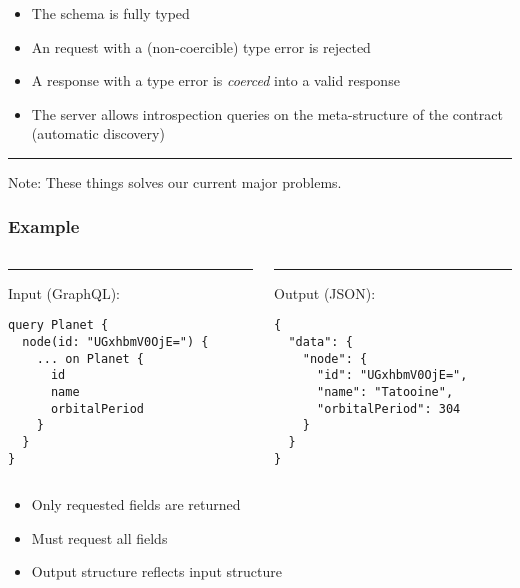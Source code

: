 \documentclass[lualatex]{beamer}
\begin{document}
\begin{frame}
  \begin{itemize}
  \item The schema is fully typed
  \item An request with a (non-coercible) type error is rejected
  \item A response with a type error is \emph{coerced} into a valid
    response
  \item The server allows introspection queries on the meta-structure
    of the contract (automatic discovery)
  \end{itemize}
  \rule{\textwidth}{1pt}
  Note: These things solves our current major problems.
\end{frame}

\begin{frame}[fragile]
  \frametitle{Example}
\begin{columns}[T] %
\begin{column}{.5\textwidth}
\color{black}\rule{\linewidth}{1pt}
Input (GraphQL):
\begin{verbatim}
query Planet {
  node(id: "UGxhbmV0OjE=") {
    ... on Planet {
      id
      name
      orbitalPeriod
    }
  }
}
\end{verbatim}
\end{column}
\hfill
\begin{column}{.5\textwidth}
\color{gray}\rule{\linewidth}{1pt}
Output (JSON):
\begin{verbatim}
{
  "data": {
    "node": {
      "id": "UGxhbmV0OjE=",
      "name": "Tatooine",
      "orbitalPeriod": 304
    }
  }
}
\end{verbatim}
\end{column}%
\end{columns}
\begin{itemize}
\item Only requested fields are returned
\item Must request all fields
\item Output structure reflects input structure
\end{itemize}
\end{frame}
\end{document}
